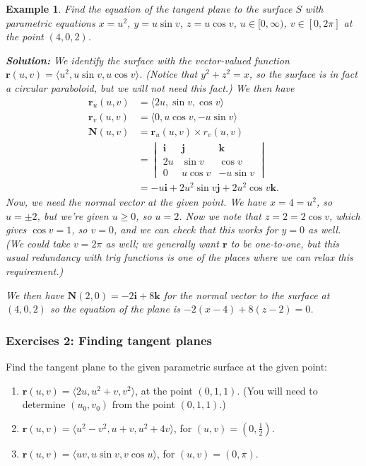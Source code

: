 \documentclass[12pt,letterpaper]{article}
\newtheorem{eg}[theorem]{Example}
\newenvironment{example}{\begin{eg}\rm}{\end{eg}}
\renewcommand{\r}{\mathbf{r}}
\renewcommand{\i}{\mathbf{i}}
\renewcommand{\j}{\mathbf{j}}
\renewcommand{\k}{\mathbf{k}}
\newcommand{\N}{\mathbf{N}}
\begin{document}
\begin{example}
 Find the equation of the tangent plane to the surface $S$ with parametric equations $x=u^2$, $y=u\sin v$, $z=u\cos v$, $u\in [0,\infty)$, $v\in [0,2\pi]$ at the point $(4,0,2)$.

\bigskip

\textbf{Solution:} We identify the surface with the vector-valued function $\r(u,v) = \langle u^2, u\sin v, u\cos v\rangle$. (Notice that $y^2+z^2 = x$, so the surface is in fact a circular paraboloid, but we will not need this fact.) We then have
\begin{align*}
 \r_u(u,v) & = \langle 2u, \sin v, \cos v\rangle\\
 \r_v(u,v) & = \langle 0, u\cos v, -u\sin v\rangle\\
 \N(u,v) & = \r_u(u,v)\times r_v(u,v) \\
& = \begin{vmatrix}
     \i&\j&\k\\2u& \sin v & \cos v\\0 & u\cos v & -u\sin v
    \end{vmatrix}\\
& = -u\i+2u^2\sin v\j + 2u^2\cos v\k.
\end{align*}
Now, we need the normal vector at the given point. We have $x=4=u^2$, so $u=\pm 2$, but we're given $u\geq 0$, so $u=2$. Now we note that $z=2=2\cos v$, which gives $\cos v=1$, so $v=0$, and we can check that this works for $y=0$ as well. (We could take $v=2\pi$ as well; we generally want $\r$ to be one-to-one, but this usual redundancy with trig functions is one of the places where we can relax this requirement.)

We then have $\N(2,0) = -2\i+8\k$ for the normal vector to the surface at $(4,0,2)$ so the equation of the plane is $-2(x-4)+8(z-2)=0$.
\end{example}

\subsubsection{Exercises 2: Finding tangent planes}
Find the tangent plane to the given parametric surface at the given point:
\begin{enumerate}
 \item $\r(u,v) = \langle 2u, u^2+v, v^2\rangle$, at the point $(0,1,1)$. (You will need to determine $(u_0,v_0)$ from the point $(0,1,1)$.)
 \item $\r(u,v) = \langle u^2-v^2, u+v, u^2+4v\rangle$, for $(u,v)=(0,\frac{1}{2})$.
 \item $\r(u,v) = \langle uv, u\sin v, v\cos u\rangle$, for $(u,v) = (0,\pi)$.
\end{enumerate}
\end{document}
